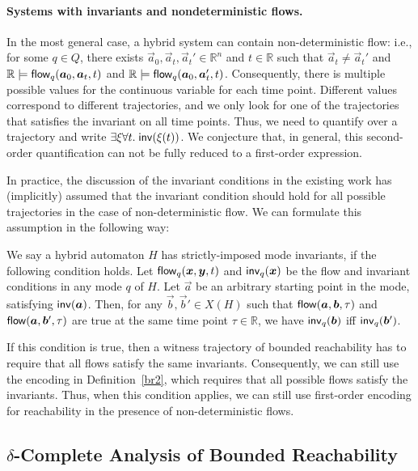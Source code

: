 \documentclass[12pt]{llncs}
\begin{document}
\paragraph{Systems with invariants and nondeterministic flows.} In the most general case, a hybrid system can contain non-deterministic flow: i.e., for some $q\in Q$, there exists $\vec a_0, \vec a_t, \vec a_t'\in \mathbb{R}^n$ and $t\in\mathbb{R}$ such that $\vec a_t\neq \vec a_t'$ and $\mathbb{R}\models \flow_q(\vec a_0, \vec a_t, t)$ and $\mathbb{R}\models \flow_q(\vec a_0, \vec a_t', t)$. Consequently, there is multiple possible values for the continuous variable for each time point. Different values correspond to different trajectories, and we only look for one of the trajectories that satisfies the invariant on all time points. Thus, we need to quantify over a trajectory and write $\exists \xi \forall t.\; \mathsf{inv}(\xi(t))$. We conjecture that, in general, this second-order quantification can not be fully reduced to a first-order expression.

In practice, the discussion of the invariant conditions in the existing work has (implicitly) assumed that the invariant condition should hold for all possible trajectories in the case of non-deterministic flow. We can formulate this assumption in the following way:
\begin{definition}
We say a hybrid automaton $H$ has strictly-imposed mode invariants, if the following condition holds. Let $\flow_q(\vec x, \vec y, t)$ and $\inv_q(\vec x)$ be the flow and invariant conditions in any mode $q$ of $H$. Let $\vec a$ be an arbitrary starting point in the mode, satisfying $\inv(\vec a)$. Then, for any  $\vec b, \vec b'\in X(H)$ such that $\flow(\vec a, \vec b, \tau)$ and $\flow(\vec a, \vec b', \tau)$ are true at the same time point $\tau\in \mathbb{R}$, we have $\inv_q(\vec b)$ iff $\inv_q (\vec b')$.
\end{definition}
If this condition is true, then a witness trajectory of bounded reachability has to require that all flows satisfy the same invariants. Consequently, we can still use the encoding in Definition~\ref{br2}, which requires that all possible flows satisfy the invariants. Thus, when this condition applies, we can still use first-order encoding for reachability in the presence of non-deterministic flows.

\subsection{$\delta$-Complete Analysis of Bounded Reachability}
\end{document}
